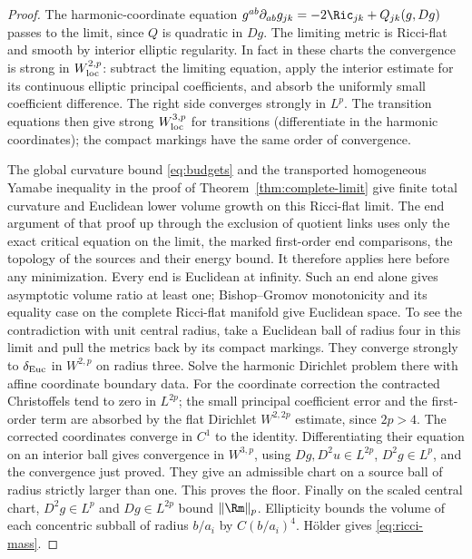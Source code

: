 \begin{proof}
The harmonic-coordinate equation
\(g^{ab}\partial_{ab}g_{jk}=-2\Ric_{jk}+Q_{jk}(g,Dg)\)
passes to the limit, since \(Q\) is quadratic in \(Dg\).
The limiting metric is Ricci-flat and smooth by interior elliptic
regularity. In fact in these charts the convergence is strong in
\(W^{2,p}_{\rm loc}\): subtract the limiting equation, apply the
interior estimate for its continuous elliptic principal coefficients,
and absorb the uniformly small coefficient difference. The right
side converges strongly in \(L^p\). The transition equations then
give strong \(W^{3,p}_{\rm loc}\) for transitions (differentiate in
the harmonic coordinates); the compact markings have the same order
of convergence.

The global curvature bound \eqref{eq:budgets} and the transported
homogeneous Yamabe inequality in the proof of
Theorem~\ref{thm:complete-limit} give finite total curvature and
Euclidean lower volume growth on this Ricci-flat limit. The end
argument of that proof up through the exclusion of quotient links
uses only the exact critical equation on the limit, the marked
first-order end comparisons, the topology of the sources and their
energy bound. It therefore applies here before any minimization.
Every end is Euclidean at infinity. Such an end alone gives
asymptotic volume ratio at least one; Bishop--Gromov monotonicity
and its equality case on the complete Ricci-flat manifold give
Euclidean space. To see the contradiction with unit central radius,
take a Euclidean ball of radius four in this limit and pull the
metrics back by its compact markings. They converge strongly to
\(\delta_{\rm Euc}\) in \(W^{2,p}\) on radius three. Solve the
harmonic Dirichlet problem there with affine coordinate boundary
data. For the coordinate correction the contracted Christoffels
tend to zero in \(L^{2p}\); the small principal coefficient error
and the first-order term are absorbed by the flat Dirichlet
\(W^{2,2p}\) estimate, since \(2p>4\). The corrected coordinates
converge in \(C^1\) to the identity. Differentiating their equation
on an interior ball gives convergence in \(W^{3,p}\), using
\(Dg,D^2u\in L^{2p}\), \(D^2g\in L^p\), and the convergence just
proved. They give an admissible chart on a source ball of radius
strictly larger than one. This proves the floor.
Finally on the scaled central chart, \(D^2g\in L^p\) and
\(Dg\in L^{2p}\) bound \(\|\Rm\|_p\). Ellipticity bounds the
volume of each concentric subball of radius \(b/a_i\) by
\(C(b/a_i)^4\). H\"older gives \eqref{eq:ricci-mass}.
\end{proof}

